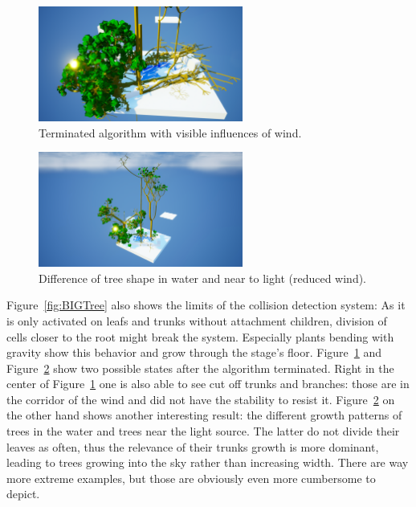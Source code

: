 \documentclass[11pt, abstract=on]{scrartcl}
\begin{document}
\begin{figure}
 	 \centering
 	    \includegraphics[width=0.6\textwidth]{SS_StageWithWind.png}
 	 \caption{Terminated algorithm with visible influences of wind.}
 	 \label{fig:StageWind}
\end{figure}

\begin{figure}
 	 \centering
 	    \includegraphics[width=0.6\textwidth]{SS_StageTallTrees.png}
 	 \caption{Difference of tree shape in water and near to light (reduced wind).}
 	 \label{fig:StageTallTrees}
\end{figure}

Figure~\ref{fig:BIGTree} also shows the limits of the collision detection system: As it is only activated on leafs and trunks without attachment children, division of cells closer to the root might break the system. Especially plants bending with gravity show this behavior and grow through the stage's floor. Figure~\ref{fig:StageWind} and Figure~\ref{fig:StageTallTrees} show two possible states after the algorithm terminated. Right in the center of Figure~\ref{fig:StageWind} one is also able to see cut off trunks and branches: those are in the corridor of the wind and did not have the stability to resist it. Figure~\ref{fig:StageTallTrees} on the other hand shows another interesting result: the different growth patterns of trees in the water and trees near the light source. The latter do not divide their leaves as often, thus the relevance of their trunks growth is more dominant, leading to trees growing into the sky rather than increasing width. There are way more extreme examples, but those are obviously even more cumbersome to depict.
\end{document}
